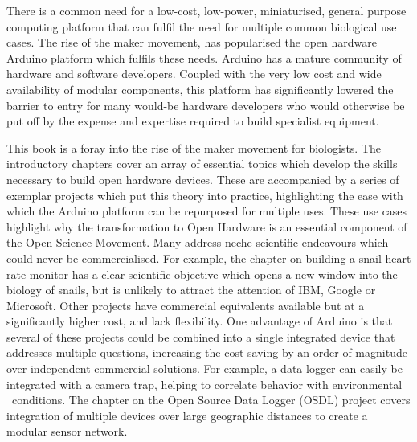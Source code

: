 \documentclass[
]{book}
\begin{document}
There is a common need for a low-cost, low-power, miniaturised, general purpose computing platform that can fulfil the need for multiple common biological use cases. The rise of the maker movement, has popularised the open hardware Arduino platform which fulfils these needs. Arduino has a mature community of hardware and software developers. Coupled with the very low cost and wide availability of modular components, this platform has significantly lowered the barrier to entry for many would-be hardware developers who would otherwise be put off by the expense and expertise required to build specialist equipment.

This book is a foray into the rise of the maker movement for biologists. The introductory chapters cover an array of essential topics which develop the skills necessary to build open hardware devices. These are accompanied by a series of exemplar projects which put this theory into practice, highlighting the ease with which the Arduino platform can be repurposed for multiple uses. These use cases highlight why the transformation to Open Hardware is an essential component of the Open Science Movement. Many address neche scientific endeavours which could never be commercialised. For example, the chapter on building a snail heart rate monitor has a clear scientific objective which opens a new window into the biology of snails, but is unlikely to attract the attention of IBM, Google or Microsoft. Other projects have commercial equivalents available but at a significantly higher cost, and lack flexibility. One advantage of Arduino is that several of these projects could be combined into a single integrated device that addresses multiple questions, increasing the cost saving by an order of magnitude over independent commercial solutions. For example, a data logger can easily be integrated with a camera trap, helping to correlate behavior with environmental ~conditions. The chapter on the Open Source Data Logger (OSDL) project covers integration of multiple devices over large geographic distances to create a modular sensor network.
\end{document}
